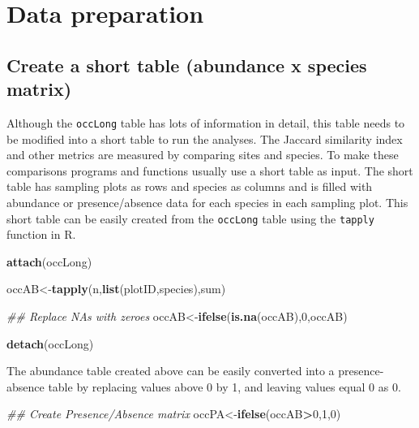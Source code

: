 \documentclass[]{article}
\newenvironment{Shaded}{\begin{snugshade}}{\end{snugshade}}
\newcommand{\CommentTok}[1]{\textcolor[rgb]{0.56,0.35,0.01}{\textit{#1}}}
\newcommand{\DecValTok}[1]{\textcolor[rgb]{0.00,0.00,0.81}{#1}}
\newcommand{\KeywordTok}[1]{\textcolor[rgb]{0.13,0.29,0.53}{\textbf{#1}}}
\newcommand{\NormalTok}[1]{#1}
\newcommand{\OperatorTok}[1]{\textcolor[rgb]{0.81,0.36,0.00}{\textbf{#1}}}
\begin{document}
\hypertarget{data-preparation}{%
\section{Data preparation}\label{data-preparation}}

\hypertarget{create-a-short-table-abundance-x-species-matrix}{%
\subsection{Create a short table (abundance x species
matrix)}\label{create-a-short-table-abundance-x-species-matrix}}

Although the \texttt{occLong} table has lots of information in detail,
this table needs to be modified into a short table to run the analyses.
The Jaccard similarity index and other metrics are measured by comparing
sites and species. To make these comparisons programs and functions
usually use a short table as input. The short table has sampling plots
as rows and species as columns and is filled with abundance or
presence/absence data for each species in each sampling plot. This short
table can be easily created from the \texttt{occLong} table using the
\texttt{tapply} function in R.

\begin{Shaded}
\begin{Highlighting}[]
\KeywordTok{attach}\NormalTok{(occLong)}

\NormalTok{occAB<-}\KeywordTok{tapply}\NormalTok{(n,}\KeywordTok{list}\NormalTok{(plotID,species),sum)}

\CommentTok{## Replace NAs with zeroes}
\NormalTok{occAB<-}\KeywordTok{ifelse}\NormalTok{(}\KeywordTok{is.na}\NormalTok{(occAB),}\DecValTok{0}\NormalTok{,occAB)}

\KeywordTok{detach}\NormalTok{(occLong)}
\end{Highlighting}
\end{Shaded}

The abundance table created above can be easily converted into a
presence-absence table by replacing values above 0 by 1, and leaving
values equal 0 as 0.

\begin{Shaded}
\begin{Highlighting}[]
\CommentTok{## Create Presence/Absence matrix}
\NormalTok{occPA<-}\KeywordTok{ifelse}\NormalTok{(occAB}\OperatorTok{>}\DecValTok{0}\NormalTok{,}\DecValTok{1}\NormalTok{,}\DecValTok{0}\NormalTok{)}
\end{Highlighting}
\end{Shaded}
\end{document}
